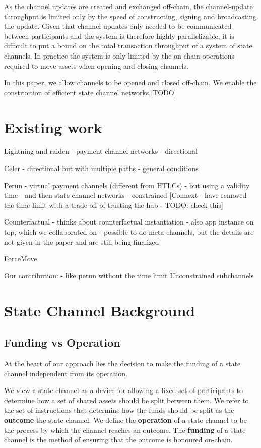 \documentclass{article}
\begin{document}
As the channel updates are created and exchanged off-chain, the channel-update throughput is limited only by the speed of constructing, signing and broadcasting the update.
Given that channel updates only needed to be communicated between participants and the system is therefore highly parallelizable, it is difficult to put a bound on the total transaction throughput of a system of state channels.
In practice the system is only limited by the on-chain operations required to move assets when opening and closing channels.

In this paper, we allow channels to be opened and closed off-chain. We enable the construction of efficient state channel networks.[TODO]

\section{Existing work}

Lightning and raiden
- payment channel networks
- directional

Celer
- directional but with multiple paths
- general conditions

Perun
- virtual payment channels (different from HTLCs)
- but using a validity time
- and then state channel networks
- constrained
[Connext - have removed the time limit with a trade-off of trusting the hub - TODO: check this]

Counterfactual
- thinks about counterfactual instantiation
- also app instance on top, which we collaborated on
- possible to do meta-channels, but the details are not given in the paper and are still being finalized

ForceMove

Our contribution:
- like perun without the time limit
Unconstrained subchannels

\section{State Channel Background}

\subsection{Funding vs Operation}

At the heart of our approach lies the decision to make the funding of a state channel independent from its operation.

We view a state channel as a device for allowing a fixed set of participants to determine how a set of shared assets should be split between them.
We refer to the set of instructions that determine how the funds should be split as the  \textbf{outcome} the state channel.
We define the \textbf{operation} of a state channel to be the process by which the channel reaches an outcome. 
The \textbf{funding} of a state channel is the method of ensuring that the outcome is honoured on-chain.
\end{document}
